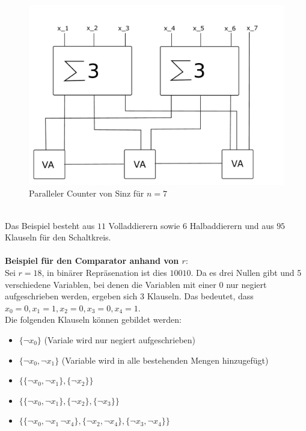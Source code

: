 \documentclass[a4,abstract=on]{scrartcl}
\begin{document}
\begin{figure}[H]
\centering
\includegraphics[width=\textwidth]{Bsp_Sinz_fein.pdf}
\caption{Paralleler Counter von Sinz für $n=7$}
\label{fig:sinz_counter_para_bsp}
\end{figure}
\ \\
Das Beispiel besteht aus $11$ Volladdierern sowie 6 Halbaddierern und aus $95$ Klauseln für den Schaltkreis.\\
\ \\
\textbf{Beispiel für den Comparator anhand von $r$}:\\
Sei $r = 18$, in binärer Repräsenation ist dies $10010$. Da es drei Nullen gibt und 5 verschiedene Variablen, bei denen die Variablen mit einer $0$ nur negiert aufgeschrieben werden, ergeben sich 3 Klauseln. Das bedeutet, dass $x_0 = 0, x_1 = 1, x_2 = 0, x_3 = 0, x_4 = 1$.\\
Die folgenden Klauseln können gebildet werden:\\
\begin{itemize}
\item $\{\neg x_0\}$ (Variale wird nur negiert aufgeschrieben)
\item  $\{\neg x_0,\neg x_1\}$ (Variable wird in alle bestehenden Mengen hinzugefügt)
\item $\{\{\neg x_0, \neg x_1\},\{\neg x_2\}\}$
\item $\{\{\neg x_0, \neg x_1\},\{\neg x_2\}, \{\neg x_3\}\}$
\item $\{\{\neg x_0, \neg x_1\, \neg x_4\},\{\neg x_2, \neg x_4\}, \{\neg x_3, \neg x_4\}\}$
\end{itemize}
\end{document}
